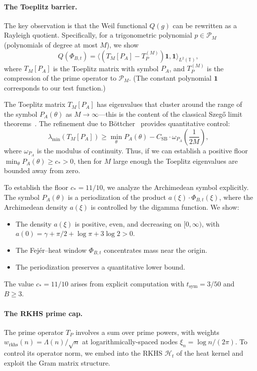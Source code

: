 \documentclass[11pt,a4paper]{article}
\theoremstyle{definition}
\theoremstyle{remark}
\newcommand{\T}{\mathbb{T}}
\begin{document}
\paragraph{The Toeplitz barrier.}
The key observation is that the Weil functional $Q(g)$ can be rewritten as a Rayleigh quotient. Specifically, for a trigonometric polynomial $p \in \mathcal{P}_M$ (polynomials of degree at most $M$), we show
\begin{equation}\label{eq:rayleigh-intro}
  Q(\Phi_{B,t}) = \langle (T_M[P_A] - T_P^{(M)}) \mathbf{1}, \mathbf{1} \rangle_{L^2(\T)},
\end{equation}
where $T_M[P_A]$ is the Toeplitz matrix with symbol $P_A$, and $T_P^{(M)}$ is the compression of the prime operator to $\mathcal{P}_M$. (The constant polynomial $\mathbf{1}$ corresponds to our test function.)

The Toeplitz matrix $T_M[P_A]$ has eigenvalues that cluster around the range of the symbol $P_A(\theta)$ as $M \to \infty$---this is the content of the classical Szeg\H{o} limit theorems~\cite{Szego1952,GrenanderSzego1958}. The refinement due to B\"ottcher~\cite{BoettcherSilbermann2006} provides quantitative control:
\[
  \lambda_{\min}(T_M[P_A]) \geq \min_\theta P_A(\theta) - C_{\mathrm{SB}} \cdot \omega_{P_A}\left(\frac{1}{2M}\right),
\]
where $\omega_{P_A}$ is the modulus of continuity. Thus, if we can establish a positive floor $\min_\theta P_A(\theta) \geq c_* > 0$, then for $M$ large enough the Toeplitz eigenvalues are bounded away from zero.

To establish the floor $c_* = 11/10$, we analyze the Archimedean symbol explicitly. The symbol $P_A(\theta)$ is a periodization of the product $a(\xi) \cdot \Phi_{B,t}(\xi)$, where the Archimedean density $a(\xi)$ is controlled by the digamma function. We show:
\begin{itemize}
\item The density $a(\xi)$ is positive, even, and decreasing on $[0, \infty)$, with $a(0) = \gamma + \pi/2 + \log \pi + 3\log 2 > 0$.
\item The Fej\'er--heat window $\Phi_{B,t}$ concentrates mass near the origin.
\item The periodization preserves a quantitative lower bound.
\end{itemize}
The value $c_* = 11/10$ arises from explicit computation with $t_{\mathrm{sym}} = 3/50$ and $B \geq 3$.

\paragraph{The RKHS prime cap.}
The prime operator $T_P$ involves a sum over prime powers, with weights $w_{\mathrm{rkhs}}(n) = \Lambda(n)/\sqrt{n}$ at logarithmically-spaced nodes $\xi_n = \log n/(2\pi)$. To control its operator norm, we embed into the RKHS $\mathcal{H}_t$ of the heat kernel and exploit the Gram matrix structure.
\end{document}
